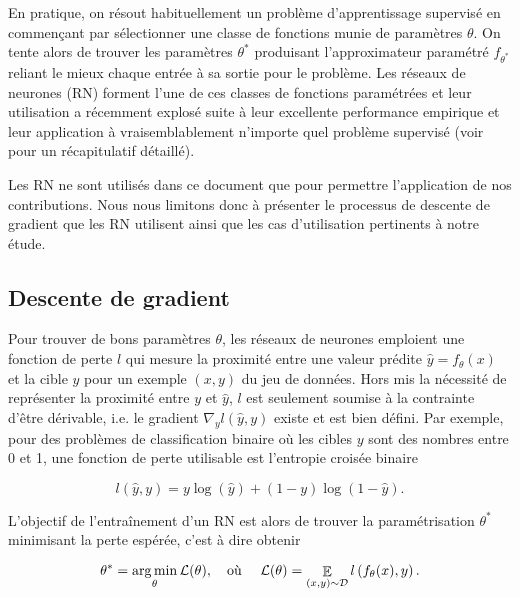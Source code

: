En pratique, on résout habituellement un problème d'apprentissage 
supervisé en commençant par sélectionner une classe de fonctions munie de 
paramètres $\theta$.
On tente alors de trouver les paramètres 
$\theta^*$ produisant l'approximateur paramétré $f_{\theta^*}$
reliant le mieux chaque entrée à sa sortie pour le problème.
Les réseaux de neurones (RN) \citep{10.5555/3086952} forment l'une de ces classes 
de fonctions paramétrées et leur utilisation a récemment explosé 
suite à leur excellente performance empirique et leur application 
à vraisemblablement n'importe quel problème supervisé (voir \cite{LIU201711}
pour un récapitulatif détaillé).

Les RN ne sont utilisés dans ce document
que pour permettre l'application de nos contributions.
Nous nous limitons donc à présenter le processus de 
descente de gradient que les RN utilisent ainsi 
que les cas d'utilisation pertinents à notre étude.

\subsection{Descente de gradient}

Pour trouver de bons paramètres $\theta$, les réseaux de neurones 
emploient une fonction de perte $l$ qui mesure la proximité entre 
une valeur prédite $\hat{y}=f_{\theta}(x)$ et la cible $y$ pour 
un exemple $(x,y)$ du jeu de données.
Hors mis la nécessité de représenter la proximité entre 
$y$ et $\hat{y}$, $l$ est seulement soumise 
à la contrainte d'être dérivable, i.e. le gradient $\nabla_y l(\hat{y}, y)$ 
existe et est bien défini.
Par exemple, pour des problèmes de classification binaire 
où les cibles $y$ sont des nombres entre 0 et 1,
une fonction de perte utilisable est l'entropie croisée binaire

\begin{equation*}
    l(\hat{y}, y) = y \log(\hat{y}) + (1 - y)\log(1 - \hat{y}).
\end{equation*}

L'objectif de l'entraînement d'un RN est alors de trouver 
la paramétrisation $\theta^*$ minimisant la perte espérée, 
c'est à dire obtenir

\begin{equation}
    \theta^* = \operatorname*{arg\,min}_{\theta} \mathcal{L}(\theta), \text{\quad où \quad} \mathcal{L}(\theta) =  \mathop{\mathbb{E}}_{(x, y) \sim \mathcal{D}} l\left(f_{\theta}(x), y\right).
    \label{eq:perte_esperee}
\end{equation}

